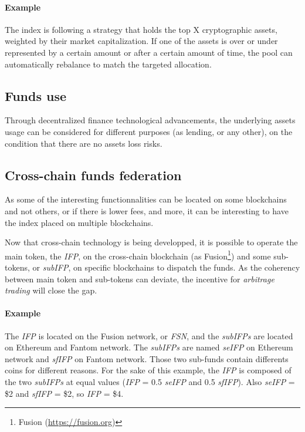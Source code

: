 \documentclass[11pt]{scrartcl}
\begin{document}
    \paragraph{Example}
    The index is following a strategy that holds the top X cryptographic assets,
    weighted by their market capitalization. If one of the assets is over or under 
    represented by a certain amount or after a certain amount of time, the pool 
    can automatically rebalance to match the targeted allocation.

    \subsection{Funds use}
    Through decentralized finance technological advancements, the underlying 
    assets usage can be considered for different purposes (as lending, or any other), 
    on the condition that there are no assets loss risks. 

    \subsection{Cross-chain funds federation}
    As some of the interesting functionnalities can be located on some blockchains
    and not others, or if there is lower fees, and more, it can be interesting to
    have the index placed on multiple blockchains.

    Now that cross-chain technology is being developped, it is possible to operate 
    the main token, the \textit{IFP}, on the cross-chain blockchain (as
    Fusion\footnote{Fusion (\url{https://fusion.org})}) and some sub-tokens, or \textit{subIFP},
    on specific blockchains to dispatch the funds. As the coherency between main token and 
    sub-tokens can deviate, the incentive for \textit{arbitrage trading} will close the gap.

    \paragraph{Example} 
    The \textit{IFP} is located on the Fusion network, or \textit{FSN}, and the
    \textit{subIFPs} are located on Ethereum and Fantom network.
    The \textit{subIFPs} are named \textit{seIFP} on Ethereum network and
    \textit{sfIFP} on Fantom network. Those two sub-funds contain differents coins for
    different reasons. For the sake of this example, the \textit{IFP} is
    composed of the two \textit{subIFPs} at equal values (\textit{IFP} = 0.5
    \textit{seIFP} and 0.5 \textit{sfIFP}). Also \textit{seIFP} = \$2 and
    \textit{sfIFP} = \$2, so \textit{IFP} = \$4.
\end{document}
